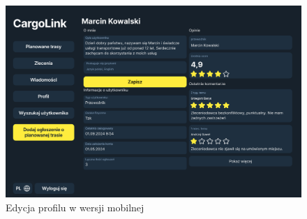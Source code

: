\begin{figure}[H]
	\centering
		\includegraphics[width=0.7\linewidth]{rozdzial1/edytuj_profil_d.jpg}
	\caption{Edycja profilu w wersji mobilnej}
	\label{Edytuj profil - desktop}
\end{figure}

